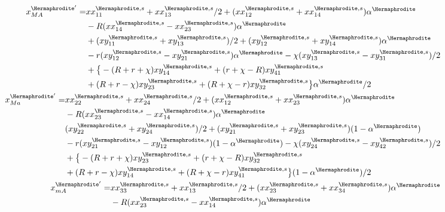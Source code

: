 \documentclass[12pt]{article}
\begin{document}
\begingroup
\allowdisplaybreaks
\begin{subequations}
\begin{align}
%
\begin{split}
x_{MA}^{{\Hermaphrodite}'}=&xx_{11}^{\Hermaphrodite,s}+xx_{13}^{\Hermaphrodite,s}/2+(xx_{12}^{\Hermaphrodite,s}+xx_{14}^{\Hermaphrodite,s})\alpha^\Hermaphrodite\\
&-R(xx_{14}^{\Hermaphrodite,s}-xx_{23}^{\Hermaphrodite,s}) \alpha^\Hermaphrodite\\
&+(xy_{11}^{\Hermaphrodite,s}+xy_{13}^{\Hermaphrodite,s})/2+(xy_{12}^{\Hermaphrodite,s}+xy_{14}^{\Hermaphrodite,s})\alpha^\Hermaphrodite\\
&- r(xy_{12}^{\Hermaphrodite,s}-xy_{21}^{\Hermaphrodite,s})\alpha^\Hermaphrodite - \chi(xy_{13}^{\Hermaphrodite,s}-xy_{31}^{\Hermaphrodite,s})/2\\
&+\big{\{}-(R+r+\chi)xy_{14}^{\Hermaphrodite,s} +(r+\chi-R)xy_{41}^{\Hermaphrodite,s}\\
&+(R+r-\chi) xy_{23}^{\Hermaphrodite,s}+(R+\chi-r)xy_{32}^{\Hermaphrodite,s}\big{\}}\alpha^\Hermaphrodite/2
\end{split}
\\
%
\begin{split}
x_{Ma}^{{\Hermaphrodite}'}=&xx_{22}^{\Hermaphrodite,s}+xx_{24}^{\Hermaphrodite,s}/2+(xx_{12}^{\Hermaphrodite,s}+xx_{23}^{\Hermaphrodite,s})\alpha^\Hermaphrodite\\
&-R(xx_{23}^{\Hermaphrodite,s}-xx_{14}^{\Hermaphrodite,s}) \alpha^\Hermaphrodite\\
&(xy_{22}^{\Hermaphrodite,s}+xy_{24}^{\Hermaphrodite,s})/2+(xy_{21}^{\Hermaphrodite,s}+xy_{23}^{\Hermaphrodite,s})(1-\alpha^\Hermaphrodite)\\
&- r(xy_{21}^{\Hermaphrodite,s}-xy_{12}^{\Hermaphrodite,s})(1-\alpha^\Hermaphrodite) - \chi(xy_{24}^{\Hermaphrodite,s}-xy_{42}^{\Hermaphrodite,s})/2\\
&+\big{\{}-(R+r+\chi)xy_{23}^{\Hermaphrodite,s}+(r+\chi-R)xy_{32}^{\Hermaphrodite,s}\\
&+(R+r-\chi) xy_{14}^{\Hermaphrodite,s}+(R+\chi-r)xy_{41}^{\Hermaphrodite,s}\big{\}}(1-\alpha^\Hermaphrodite)/2
\end{split}
\\
%
\begin{split}
x_{mA}^{{\Hermaphrodite}'}=&xx_{33}^{\Hermaphrodite,s}+xx_{13}^{\Hermaphrodite,s}/2+(xx_{23}^{\Hermaphrodite,s}+xx_{34}^{\Hermaphrodite,s})\alpha^\Hermaphrodite\\
&-R(xx_{23}^{\Hermaphrodite,s}-xx_{14}^{\Hermaphrodite,s}) \alpha^\Hermaphrodite\\

\end{split}
\end{align}
\end{subequations}
\end{document}
